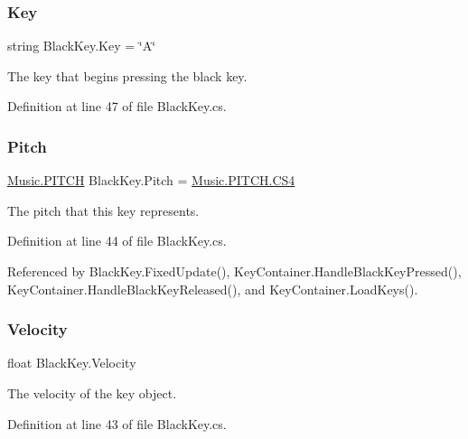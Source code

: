 \subsubsection{\texorpdfstring{Key}{Key}}
{\footnotesize\ttfamily string Black\+Key.\+Key = \char`\"{}A\char`\"{}}



The key that begins pressing the black key. 



Definition at line 47 of file Black\+Key.\+cs.

\mbox{\label{group___black_key_pub_var_gad233c456182c9cef7c01486484940439}} 
\subsubsection{\texorpdfstring{Pitch}{Pitch}}
{\footnotesize\ttfamily \hyperlink{group___music_enums_ga508f69b199ea518f935486c990edac1d}{Music.\+P\+I\+T\+CH} Black\+Key.\+Pitch = \hyperlink{group___music_enums_gga508f69b199ea518f935486c990edac1da7009daf81333670cd06b8bb2b02054cc}{Music.\+P\+I\+T\+C\+H.\+C\+S4}}



The pitch that this key represents. 



Definition at line 44 of file Black\+Key.\+cs.



Referenced by Black\+Key.\+Fixed\+Update(), Key\+Container.\+Handle\+Black\+Key\+Pressed(), Key\+Container.\+Handle\+Black\+Key\+Released(), and Key\+Container.\+Load\+Keys().

\mbox{\label{group___black_key_pub_var_ga6fb983b09b3b6f80eab375fcb43010c1}} 
\subsubsection{\texorpdfstring{Velocity}{Velocity}}
{\footnotesize\ttfamily float Black\+Key.\+Velocity}



The velocity of the key object. 



Definition at line 43 of file Black\+Key.\+cs.


